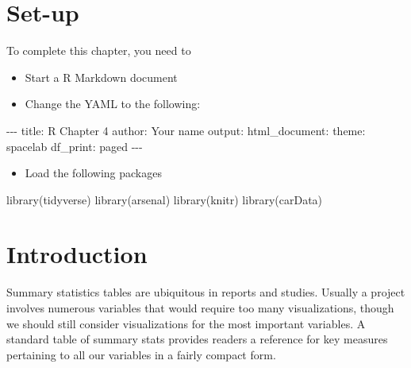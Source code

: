 \documentclass[
]{book}
\makeatletter
\newenvironment{Shaded}{\begin{snugshade}}{\end{snugshade}}
\newcommand{\FunctionTok}[1]{\textcolor[rgb]{0,0,0}{#1}}
\newcommand{\NormalTok}[1]{#1}
\newcommand{\SpecialCharTok}[1]{\textcolor[rgb]{0,0,0}{#1}}
\newcommand{\StringTok}[1]{\textcolor[rgb]{0.5,0.5,0.5}{#1}}
\providecommand{\tightlist}{%
  \setlength{\itemsep}{0pt}\setlength{\parskip}{0pt}}
\newenvironment{kframe}{%
\medskip{}
\setlength{\fboxsep}{.8em}
 \def\at@end@of@kframe{}%
 \ifinner\ifhmode%
  \def\at@end@of@kframe{\end{minipage}}%
  \begin{minipage}{\columnwidth}%
 \fi\fi%
 \def\FrameCommand##1{\hskip\@totalleftmargin \hskip-\fboxsep
 \colorbox{shadecolor}{##1}\hskip-\fboxsep
     \hskip-\linewidth \hskip-\@totalleftmargin \hskip\columnwidth}%
 \MakeFramed {\advance\hsize-\width
   \@totalleftmargin\z@ \linewidth\hsize
   \@setminipage}}%
 {\par\unskip\endMakeFramed%
 \at@end@of@kframe}
\renewenvironment{Shaded}{\begin{kframe}}{\end{kframe}}
\makeatother
\begin{document}
\hypertarget{set-up}{%
\section{Set-up}\label{set-up}}

To complete this chapter, you need to

\begin{itemize}
\tightlist
\item
  Start a R Markdown document
\item
  Change the YAML to the following:
\end{itemize}

\begin{Shaded}
\begin{Highlighting}[]
\SpecialCharTok{{-}{-}{-}}
\NormalTok{title}\SpecialCharTok{:} \StringTok{\textquotesingle{}R Chapter 4\textquotesingle{}}
\NormalTok{author}\SpecialCharTok{:} \StringTok{\textquotesingle{}Your name\textquotesingle{}}
\NormalTok{output}\SpecialCharTok{:} 
\NormalTok{  html\_document}\SpecialCharTok{:}
\NormalTok{    theme}\SpecialCharTok{:}\NormalTok{ spacelab}
\NormalTok{    df\_print}\SpecialCharTok{:}\NormalTok{ paged}
\SpecialCharTok{{-}{-}{-}}
\end{Highlighting}
\end{Shaded}

\begin{itemize}
\tightlist
\item
  Load the following packages
\end{itemize}

\begin{Shaded}
\begin{Highlighting}[]
\FunctionTok{library}\NormalTok{(tidyverse)}
\FunctionTok{library}\NormalTok{(arsenal)}
\FunctionTok{library}\NormalTok{(knitr)}
\FunctionTok{library}\NormalTok{(carData)}
\end{Highlighting}
\end{Shaded}

\hypertarget{introduction}{%
\section{Introduction}\label{introduction}}

Summary statistics tables are ubiquitous in reports and studies. Usually a project involves numerous variables that would require too many visualizations, though we should still consider visualizations for the most important variables. A standard table of summary stats provides readers a reference for key measures pertaining to all our variables in a fairly compact form.
\end{document}
